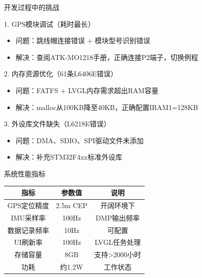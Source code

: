 \documentclass[10pt,aspectratio=169,mathserif]{beamer}
\begin{document}
\begin{frame}{开发过程中的挑战}
    \begin{block}{1. GPS模块调试（{\color{red}耗时最长}）}
    \begin{itemize}
        \item {\color{red}问题：}跳线帽连接错误 + 模块型号识别错误
        \item {\color{green!60!black}解决：}查阅ATK-MO1218手册，正确连接P2端子，切换例程
    \end{itemize}
    \end{block}
    \vspace{-0.2cm}
    \begin{block}{2. 内存资源优化（{\color{red}61条L6406E错误}）}
    \begin{itemize}
        \item {\color{red}问题：}FATFS + LVGL内存需求超出RAM容量
        \item {\color{green!60!black}解决：}malloc从100KB降至40KB，正确配置IRAM1=128KB
    \end{itemize}
    \end{block}
    \vspace{-0.2cm}
    \begin{block}{3. 外设库文件缺失（{\color{red}L6218E错误}）}
    \begin{itemize}
        \item {\color{red}问题：}DMA、SDIO、SPI驱动文件未添加
        \item {\color{green!60!black}解决：}补充STM32F4xx标准外设库
    \end{itemize}
    \end{block}
\end{frame}

\begin{frame}{系统性能指标}
\begin{table}
\centering
\begin{tabular}{|c|c|c|}
\hline
\textbf{指标} & \textbf{参数值} & \textbf{说明} \\
\hline
GPS定位精度 & 2.5m CEP & 开阔环境下 \\
\hline
IMU采样率 & 100Hz & DMP输出频率 \\
\hline
数据记录频率 & 10Hz & 可配置 \\
\hline
UI刷新率 & 100Hz & LVGL任务处理 \\
\hline
存储容量 & 8GB & 支持>2000小时 \\
\hline
功耗 & 约1.2W & 工作状态 \\
\hline
\end{tabular}
\end{table}
\end{frame}
\end{document}
